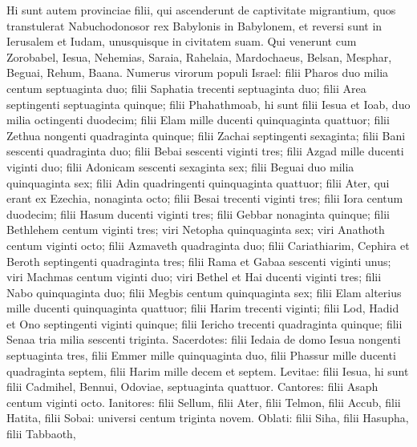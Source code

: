 \begin{biblechapter}  
\verse Hi sunt autem provinciae filii, qui ascenderunt de captivitate migrantium, quos transtulerat Nabuchodonosor rex Babylonis in Babylonem, et reversi sunt in Ierusalem et Iudam, unusquisque in civitatem suam. 
\verse Qui venerunt cum Zorobabel, Iesua, Nehemias, Saraia, Rahelaia, Mardochaeus, Belsan, Mesphar, Beguai, Rehum, Baana. Numerus virorum populi Israel: 
\verse filii Pharos duo milia centum septuaginta duo; 
\verse filii Saphatia trecenti septuaginta duo; 
\verse filii Area septingenti septuaginta quinque; 
\verse filii Phahathmoab, hi sunt filii Iesua et Ioab, duo milia octingenti duodecim; 
\verse filii Elam mille ducenti quinquaginta quattuor;  
\verse filii Zethua nongenti quadraginta quinque; 
\verse filii Zachai septingenti sexaginta; 
\verse filii Bani sescenti quadraginta duo; 
\verse filii Bebai sescenti viginti tres; 
\verse filii Azgad mille ducenti viginti duo; 
\verse filii Adonicam sescenti sexaginta sex; 
\verse filii Beguai duo milia quinquaginta sex; 
\verse filii Adin quadringenti quinquaginta quattuor; 
\verse filii Ater, qui erant ex Ezechia, nonaginta octo; 
\verse filii Besai trecenti viginti tres; 
\verse filii Iora centum duodecim; 
\verse filii Hasum ducenti viginti tres; 
\verse filii Gebbar nonaginta quinque; 
\verse filii Bethlehem centum viginti tres; 
\verse viri Netopha quinquaginta sex; 
\verse viri Anathoth centum viginti octo; 
\verse filii Azmaveth quadraginta duo; 
\verse filii Cariathiarim, Cephira et Beroth septingenti quadraginta tres; 
\verse filii Rama et Gabaa sescenti viginti unus; 
\verse viri Machmas centum viginti duo; 
\verse viri Bethel et Hai ducenti viginti tres; 
\verse filii Nabo quinquaginta duo;  
\verse filii Megbis centum quinquaginta sex; 
\verse filii Elam alterius mille ducenti quinquaginta quattuor; 
\verse filii Harim trecenti viginti; 
\verse filii Lod, Hadid et Ono septingenti viginti quinque; 
\verse filii Iericho trecenti quadraginta quinque; 
\verse filii Senaa tria milia sescenti triginta. 
\verse Sacerdotes: filii Iedaia de domo Iesua nongenti septuaginta tres, 
\verse filii Emmer mille quinquaginta duo, 
\verse filii Phassur mille ducenti quadraginta septem, 
\verse filii Harim mille decem et septem. 
\verse Levitae: filii Iesua, hi sunt filii Cadmihel, Bennui, Odoviae, septuaginta quattuor. 
\verse Cantores: filii Asaph centum viginti octo. 
\verse Ianitores: filii Sellum, filii Ater, filii Telmon, filii Accub, filii Hatita, filii Sobai: universi centum triginta novem. 
\verse Oblati: filii Siha, filii Hasupha, filii Tabbaoth, 

\end{biblechapter}
